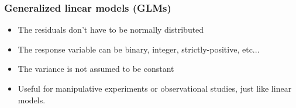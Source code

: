 \documentclass[color=usenames,dvipsnames]{beamer}\usepackage[]{graphicx}\usepackage[]{color}
\begin{document}
\begin{frame}
  \frametitle{Generalized linear models (GLMs)}
  \large
  \begin{itemize}%
    \item<2-> The residuals don't have to be normally distributed
    \item<3-> The response variable can be binary, integer,
      strictly-positive, etc...
    \item<4-> The variance is not assumed to be constant
    \item<5-> Useful for manipulative experiments or observational
      studies, just like linear models.
  \end{itemize}
  \vfill
\end{frame}
\end{document}
